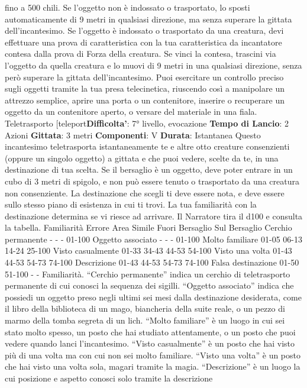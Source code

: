 \begin{multicols}{2}
fino a 500 chili. Se l’oggetto non è indossato o
trasportato, lo sposti automaticamente di 9 metri in
qualsiasi direzione, ma senza superare la gittata
dell’incantesimo.
Se l’oggetto è indossato o trasportato da una creatura,
devi effettuare una prova di caratteristica con la tua
caratteristica da incantatore contesa dalla prova di
Forza della creatura. Se vinci la contesa, trascini via
l’oggetto da quella creatura e lo muovi di 9 metri in una
qualsiasi direzione, senza però superare la gittata
dell’incantesimo.
Puoi esercitare un controllo preciso sugli oggetti tramite
la tua presa telecinetica, riuscendo così a manipolare
un attrezzo semplice, aprire una porta o un contenitore,
inserire o recuperare un oggetto da un contenitore
aperto, o versare del materiale in una fiala.
Teletrasporto
[teleport\textbf{Difficolta'}:
7° livello, evocazione
\textbf{Tempo di Lancio}: 2 Azioni
\textbf{Gittata}: 3 metri
\textbf{Componenti}: V
\textbf{Durata}: Istantanea
Questo incantesimo teletrasporta istantaneamente te e
altre otto creature consenzienti (oppure un singolo
oggetto) a gittata e che puoi vedere, scelte da te, in una
destinazione di tua scelta. Se il bersaglio è un oggetto,
deve poter entrare in un cubo di 3 metri di spigolo, e
non può essere tenuto o trasportato da una creatura
non consenziente.
La destinazione che scegli ti deve essere nota, e deve
essere sullo stesso piano di esistenza in cui ti trovi. La
tua familiarità con la destinazione determina se vi riesce
ad arrivare. Il Narratore tira il d100 e consulta la tabella.
Familiarità Errore Area
Simile
Fuori
Bersaglio
Sul
Bersaglio
Cerchio
permanente
- - - 01-100
Oggetto
associato
- - - 01-100
Molto
familiare
01-05 06-13 14-24 25-100
Visto
casualmente
01-33 34-43 44-53 54-100
Visto una
volta
01-43 44-53 54-73 74-100
Descrizione 01-43 44-53 54-73 74-100
Falsa
destinazione
01-50 51-100 - -
Familiarità. “Cerchio permanente” indica un cerchio di
teletrasporto permanente di cui conosci la sequenza dei
sigilli. “Oggetto associato” indica che possiedi un
oggetto preso negli ultimi sei mesi dalla destinazione
desiderata, come il libro della biblioteca di un mago,
biancheria della suite reale, o un pezzo di marmo della
tomba segreta di un lich.
“Molto familiare” è un luogo in cui sei stato molto
spesso, un posto che hai studiato attentamente, o un
posto che puoi vedere quando lanci l’incantesimo.
“Visto casualmente” è un posto che hai visto più di una
volta ma con cui non sei molto familiare. “Visto una
volta” è un posto che hai visto una volta sola, magari
tramite la magia. “Descrizione” è un luogo la cui
posizione e aspetto conosci solo tramite la descrizione

\end{multicols}
